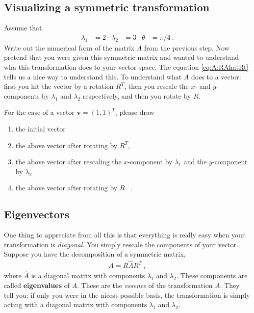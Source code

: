 \documentclass[12pt]{article}
\numberwithin{equation}{section}    %
\renewcommand{\vec}[1]{\mathbf{#1}} %
\begin{document}
\subsection{Visualizing a symmetric transformation}

Assume that 
\begin{align}
	\lambda_1 &= 2 &
	\lambda_2 &= 3 &
	\theta &= \pi/4 \ .
\end{align}
Write out the numerical form of the matrix $A$ from the previous step. Now pretend that you were given this symmetric matrix and wanted to understand wha this transformation does to your vector space. The equation \eqref{eq:A:RAhatRt} tells us a nice way to understand this. To understand what $A$ does to a vector: first you hit the vector by a rotation $R^T$, then you rescale the $x$- and $y$-components by $\lambda_1$ and $\lambda_2$ respectively, and then you rotate by $R$.

For the case of a vector $\vec{v} = (1,1)^T$, please draw 
\begin{enumerate}
	\item the initial vector
	\item the above vector after rotating by $R^T$,
	\item the above vector after rescaling the $x$-component by $\lambda_1$ and the $y$-component by $\lambda_2$
	\item the above vector after rotating by $R$ \ .
\end{enumerate}

\subsection{Eigenvectors}

One thing to appreciate from all this is that everything is really easy when your transformation is \emph{diagonal}. You simply rescale the components of your vector. Suppose you have the decomposition of a symmetric matrix,
\begin{align}
	A = R \hat A R^T \ ,
\end{align}
where $\hat A$ is a diagonal matrix with components $\lambda_1$ and $\lambda_2$. These components are called \textbf{eigenvalues} of $A$. These are the \emph{essence} of the transformation $A$. They tell you: if only you were in the nicest possible basis, the transformation is simply acting with a diagonal matrix with components $\lambda_1$ and $\lambda_2$.
\end{document}
